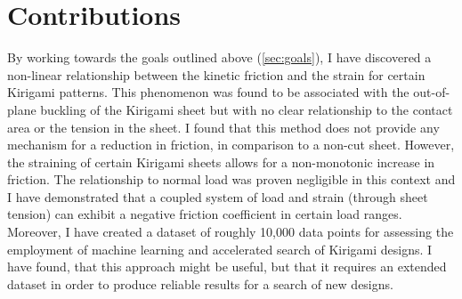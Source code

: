 






\section{Contributions}
By working towards the goals outlined above (\cref{sec:goals}), I have
discovered a non-linear relationship between the kinetic friction and the strain
for certain Kirigami patterns. This phenomenon was found to be associated with
the out-of-plane buckling of the Kirigami sheet but with no clear relationship
to the contact area or the tension in the sheet. I found that this method does
not provide any mechanism for a reduction in friction, in comparison to a
non-cut sheet. However, the straining of certain Kirigami sheets allows for a
non-monotonic increase in friction. The relationship to normal load was proven
negligible in this context and I have demonstrated that a coupled system of load
and strain (through sheet tension) can exhibit a negative friction coefficient
in certain load ranges. Moreover, I have created a dataset of roughly 10,000
data points for assessing the employment of machine learning and accelerated
search of Kirigami designs. I have found, that this approach might be useful,
but that it requires an extended dataset in order to produce reliable results for a
search of new designs.

